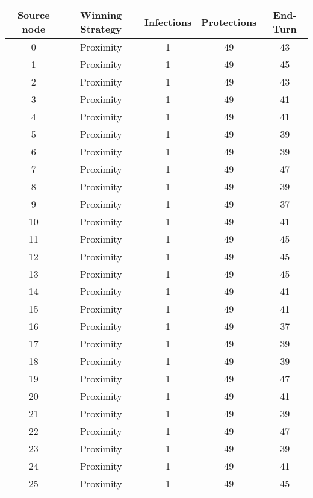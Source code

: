\documentclass[results.tex]{subfiles}
\begin{document}
\begin{center}
  \begin{tabular}{| c || c | c | c | c |}
    \hline
    {\bfseries Source node} & {\bfseries Winning Strategy} & {\bfseries Infections} & {\bfseries Protections} & {\bfseries End-Turn} \\  %
    \hline\hline
    0 & Proximity & 1 & 49 & 43 \\ 
    \hline
    1 & Proximity & 1 & 49 & 45 \\ 
    \hline
    2 & Proximity & 1 & 49 & 43 \\ 
    \hline
    3 & Proximity & 1 & 49 & 41 \\ 
    \hline
    4 & Proximity & 1 & 49 & 41 \\ 
    \hline
    5 & Proximity & 1 & 49 & 39 \\ 
    \hline
    6 & Proximity & 1 & 49 & 39 \\ 
    \hline
    7 & Proximity & 1 & 49 & 47 \\ 
    \hline
    8 & Proximity & 1 & 49 & 39 \\ 
    \hline
    9 & Proximity & 1 & 49 & 37 \\ 
    \hline
    10 & Proximity & 1 & 49 & 41 \\ 
    \hline
    11 & Proximity & 1 & 49 & 45 \\ 
    \hline
    12 & Proximity & 1 & 49 & 45 \\ 
    \hline
    13 & Proximity & 1 & 49 & 45 \\ 
    \hline
    14 & Proximity & 1 & 49 & 41 \\ 
    \hline
    15 & Proximity & 1 & 49 & 41 \\ 
    \hline
    16 & Proximity & 1 & 49 & 37 \\ 
    \hline
    17 & Proximity & 1 & 49 & 39 \\ 
    \hline
    18 & Proximity & 1 & 49 & 39 \\ 
    \hline
    19 & Proximity & 1 & 49 & 47 \\ 
    \hline
    20 & Proximity & 1 & 49 & 41 \\ 
    \hline
    21 & Proximity & 1 & 49 & 39 \\ 
    \hline
    22 & Proximity & 1 & 49 & 47 \\ 
    \hline
    23 & Proximity & 1 & 49 & 39 \\ 
    \hline
    24 & Proximity & 1 & 49 & 41 \\ 
    \hline
    25 & Proximity & 1 & 49 & 45 \\ 

\end{tabular}
\end{center}
\end{document}
